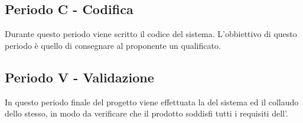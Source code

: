 \documentclass[./PianoDiProgetto.tex]{subfiles}
\begin{document}
  \subsection{Periodo C - Codifica}

  Durante questo periodo viene scritto il codice del sistema. L'obbiettivo
  di questo periodo è quello di consegnare al proponente un  qualificato.

  \subsection{Periodo V - Validazione}

  In questo periodo finale del progetto viene effettuata la  del sistema ed il
  collaudo dello stesso, in modo da verificare che il prodotto soddisfi tutti i requisiti
  dell'\ARdoc. 
\end{document}
